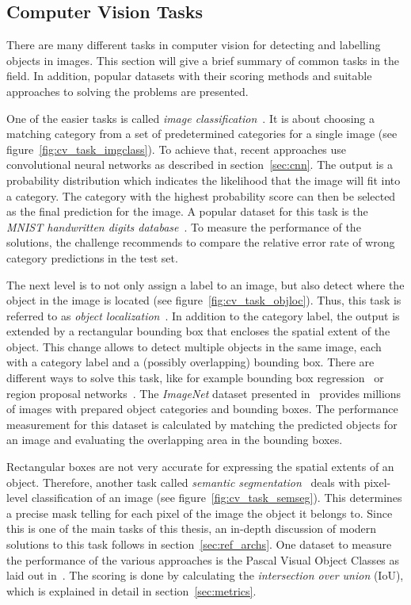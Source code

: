 \subsection{Computer Vision Tasks}
There are many different tasks in computer vision for detecting and labelling objects in images. This section will give a brief summary of common tasks in the field. In addition, popular datasets with their scoring methods and suitable approaches to solving the problems are presented.

One of the easier tasks is called \emph{image classification}~\cite[p.~98]{DLbook16}. It is about choosing a matching category from a set of predetermined categories for a single image (see figure~\ref{fig:cv_task_imgclass}). To achieve that, recent approaches use convolutional neural networks as described in section~\ref{sec:cnn}. The output is a probability distribution which indicates the likelihood that the image will fit into a category. The category with the highest probability score can then be selected as the final prediction for the image. A popular dataset for this task is the \emph{MNIST handwritten digits database}~\cite{mnist10}. To measure the performance of the solutions, the challenge recommends to compare the relative error rate of wrong category predictions in the test set.

The next level is to not only assign a label to an image, but also detect where the object in the image is located (see figure~\ref{fig:cv_task_objloc}). Thus, this task is referred to as \emph{object localization}~\cite{rcnn14}. In addition to the category label, the output is extended by a rectangular bounding box that encloses the spatial extent of the object. This change allows to detect multiple objects in the same image, each with a category label and a (possibly overlapping) bounding box. There are different ways to solve this task, like for example bounding box regression~\cite{obj_detection13} or region proposal networks~\cite{ff-rcnn14}. The \emph{ImageNet} dataset presented in~\cite{imgnet09} provides millions of images with prepared object categories and bounding boxes. The performance measurement for this dataset is calculated by matching the predicted objects for an image and evaluating the overlapping area in the bounding boxes.

Rectangular boxes are not very accurate for expressing the spatial extents of an object. Therefore, another task called \emph{semantic segmentation}~\cite{weakseg15} deals with pixel-level classification of an image (see figure~\ref{fig:cv_task_semseg}). This determines a precise mask telling for each pixel of the image the object it belongs to. Since this is one of the main tasks of this thesis, an in-depth discussion of modern solutions to this task follows in section~\ref{sec:ref_archs}. One dataset to measure the performance of the various approaches is the Pascal Visual Object Classes as laid out in~\cite{pascal_voc15}. The scoring is done by calculating the \emph{intersection over union} (IoU), which is explained in detail in section~\ref{sec:metrics}.

